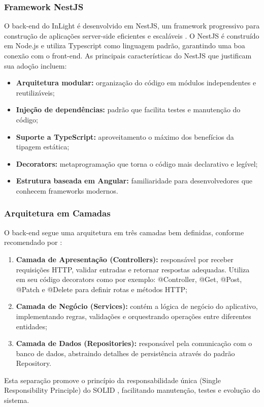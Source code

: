 \subsubsection{Framework NestJS}
O back-end do InLight é desenvolvido em NestJS, um framework progressivo para construção de aplicações server-side eficientes e escaláveis \cite{nestjs2023}. O NestJS é construído em Node.js e utiliza Typescript como linguagem padrão, garantindo uma boa conexão com o front-end.
As principais características do NestJS que justificam sua adoção incluem:
\begin{itemize}
    \item \textbf{Arquitetura modular:} organização do código em módulos independentes e reutilizáveis;
    \item \textbf{Injeção de dependências:} padrão que facilita testes e manutenção do código;
    \item \textbf{Suporte a TypeScript:} aproveitamento o máximo dos benefícios da tipagem estática;
    \item \textbf{Decorators:} metaprogramação que torna o código mais declarativo e legível;
    \item \textbf{Estrutura baseada em Angular:} familiaridade para desenvolvedores que conhecem frameworks modernos.
\end{itemize}

\subsubsection{Arquitetura em Camadas}
O back-end segue uma arquitetura em três camadas bem definidas, conforme recomendado por \cite{fowler2002}:
\begin{enumerate}
    \item \textbf{Camada de Apresentação (Controllers):} responsável por receber requisições HTTP, validar entradas e retornar respostas adequadas. Utiliza em seu código decorators como por exemplo: @Controller, @Get, @Post, @Patch e @Delete para definir rotas e métodos HTTP;
    
    \item \textbf{Camada de Negócio (Services):} contém a lógica de negócio do aplicativo, implementando regras, validações e orquestrando operações entre diferentes entidades;
    
    \item \textbf{Camada de Dados (Repositories):} responsável pela comunicação com o banco de dados, abstraindo detalhes de persistência através do padrão Repository.
\end{enumerate}
Esta separação promove o princípio da responsabilidade única (Single Responsibility Principle) do SOLID \cite{martin2008}, facilitando manutenção, testes e evolução do sistema.
